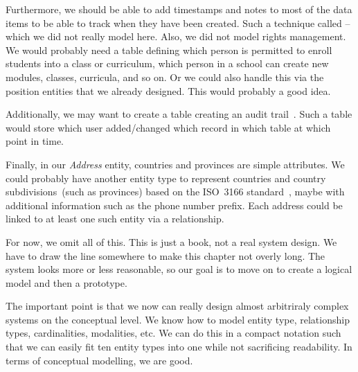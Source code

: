 Furthermore, we should be able to add timestamps and notes to most of the data items to be able to track when they have been created.
Such a technique called  -- which we did not really model here.
Also, we did not model rights management.
We would probably need a table defining which person is permitted to enroll students into a class or curriculum, which person in a school can create new modules, classes, curricula, and so on.
Or we could also handle this via the position entities that we already designed.
This would probably a good idea.

Additionally, we may want to create a table creating an audit trail~\cite{K2010ATTDCID}.
Such a table would store which user added/changed which record in which table at which point in time.

Finally, in our \emph{Address} entity, countries and provinces are simple attributes.
We could probably have another entity type to represent countries and country subdivisions~(such as provinces) based on the ISO~3166 standard~\cite{ISO3166,HD2025IISC}, maybe with additional information such as the phone number prefix.
Each address could be linked to at least one such entity via a relationship.

For now, we omit all of this.
This is just a book, not a real system design.
We have to draw the line somewhere to make this chapter not overly long.
The system looks more or less reasonable, so our goal is to move on to create a logical model and then a prototype.

The important point is that we now can really design almost arbitriraly complex systems on the conceptual level.
We know how to model entity type, relationship types, cardinalities, modalities, etc.
We can do this in a compact notation such that we can easily fit ten entity types into one  while not sacrificing readability.
In terms of conceptual modelling, we are good.%
%
\FloatBarrier%
\endhsection%
%
